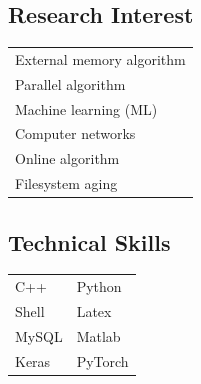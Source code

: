 \documentclass[letterpaper,11pt]{article}
\begin{document}
\begin{minipage}{0.25\textwidth}
\subsection*{Research Interest}
\begin{center}
\begin{tabular*}{\textwidth}{ m{5cm} }
\rowcolor{Gray} External memory algorithm \\
\rowcolor{Gray} Parallel algorithm \\
\rowcolor{Gray} Machine learning (ML) \\
\rowcolor{Gray} Computer networks \\
\rowcolor{Gray} Online algorithm \\
\rowcolor{Gray} Filesystem aging \\
\end{tabular*}
\end{center}
\subsection*{Technical Skills}
\begin{center}
\begin{tabular*}{\textwidth}{ m{3cm} m{2cm} }
\rowcolor{Gray} C++ & Python \\
\rowcolor{Gray} Shell & Latex \\
\rowcolor{Gray} MySQL & Matlab \\
\rowcolor{Gray} Keras & PyTorch \\
\end{tabular*}
\end{center}
\end{minipage}

\end{document}
